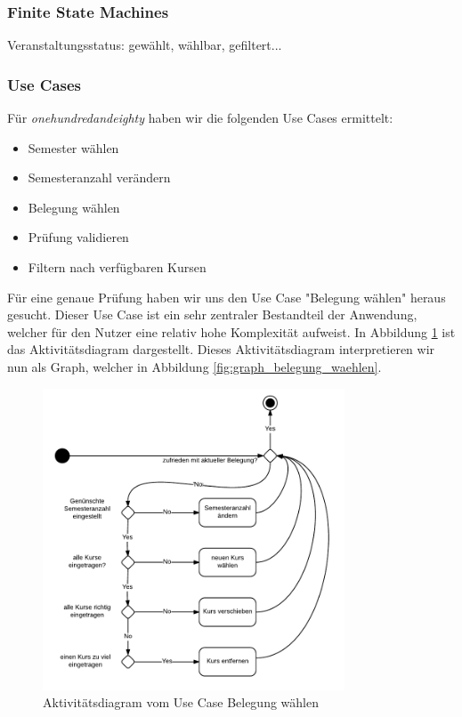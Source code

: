 \documentclass[ngerman]{article}
\begin{document}
\subsubsection{Finite State Machines}
Veranstaltungsstatus: gewählt, wählbar, gefiltert...


\subsubsection{Use Cases}
Für \emph{onehundredandeighty} haben wir die folgenden Use Cases ermittelt:

\begin{itemize}
    \item Semester wählen
    \item Semesteranzahl verändern
    \item Belegung wählen
    \item Prüfung validieren
    \item Filtern nach verfügbaren Kursen
\end{itemize}

Für eine genaue Prüfung haben wir uns den Use Case "Belegung wählen" heraus gesucht. Dieser Use Case ist ein sehr zentraler Bestandteil der Anwendung, welcher für den Nutzer eine relativ hohe Komplexität aufweist. In Abbildung \ref{fig:aktivity_belegung_waehlen} ist das Aktivitätsdiagram dargestellt. Dieses Aktivitätsdiagram interpretieren wir nun als Graph, welcher in Abbildung \ref{fig:graph_belegung_waehlen}.

\begin{figure}[h!]
\includegraphics[width=0.8\textwidth]{figures/180_Belegungaendern_aktivitaet.pdf}
\caption{Aktivitätsdiagram vom Use Case Belegung wählen}
\label{fig:aktivity_belegung_waehlen}
\end{figure}
\end{document}
